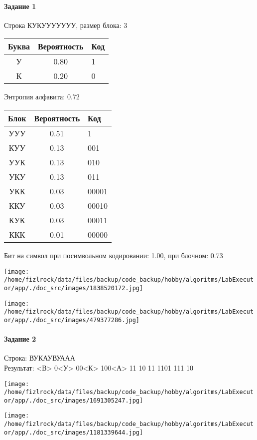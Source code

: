 \documentclass[a4paper, 12pt]{article}
\begin{document}
\paragraph{Задание 1}

Строка КУКУУУУУУУ, размер блока: 3
\begin{center}
 \begin{tabular}{ |c|c|l| } 
  \hline
     Буква & Вероятность & Код\\ \hline
У & 0.80 & 1\\\hline
К & 0.20 & 0
\\ \hline \end{tabular}
\end{center}
Энтропия алфавита: 0.72
\begin{center}
 \begin{tabular}{ |c|c|l| } 
  \hline
     Блок & Вероятность & Код\\ \hline
УУУ & 0.51 & 1\\\hline
КУУ & 0.13 & 001\\\hline
УУК & 0.13 & 010\\\hline
УКУ & 0.13 & 011\\\hline
УКК & 0.03 & 00001\\\hline
ККУ & 0.03 & 00010\\\hline
КУК & 0.03 & 00011\\\hline
ККК & 0.01 & 00000
\\ \hline \end{tabular}
\end{center}
Бит на символ при посимвольном кодировании: 1.00, при блочном: 0.73

\texttt{[image: /home/fizlrock/data/files/backup/code\_backup/hobby/algoritms/LabExecutor/app/./doc\_src/images/1838520172.jpg]}

\texttt{[image: /home/fizlrock/data/files/backup/code\_backup/hobby/algoritms/LabExecutor/app/./doc\_src/images/479377286.jpg]}
\pagebreak
\paragraph{Задание 2}

Строка: 
ВУКАУВУААА\\
Результат: <В> 0<У> 00<К> 100<А> 11 10 11 1101 111 10

\texttt{[image: /home/fizlrock/data/files/backup/code\_backup/hobby/algoritms/LabExecutor/app/./doc\_src/images/1691305247.jpg]}

\texttt{[image: /home/fizlrock/data/files/backup/code\_backup/hobby/algoritms/LabExecutor/app/./doc\_src/images/1181339644.jpg]}
\end{document}
